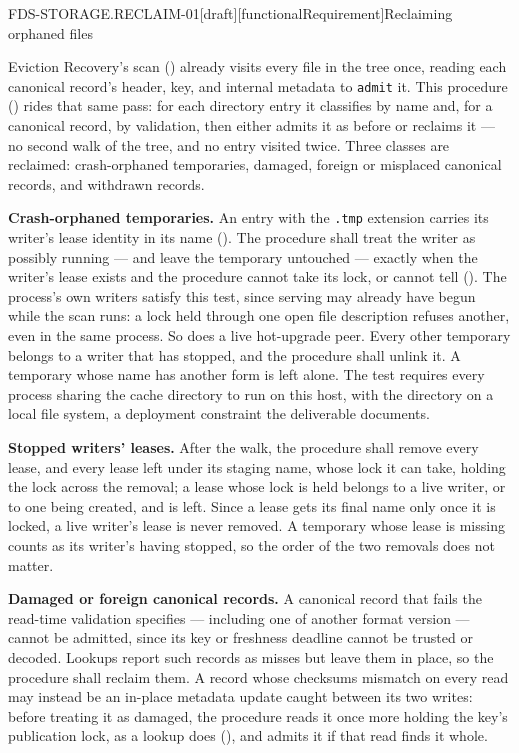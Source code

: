 \begin{requirement}{FDS-STORAGE.RECLAIM-01}[draft][functionalRequirement]{Reclaiming orphaned files}


  Eviction Recovery's scan () already visits
  every file in the tree once, reading each canonical record's header, key,
  and internal metadata to \texttt{admit} it. This procedure
  () rides that same pass: for each directory
  entry it classifies by name and, for a canonical record, by validation,
  then either admits it as before or reclaims it --- no second walk of the
  tree, and no entry visited twice. Three classes are reclaimed:
  crash-orphaned temporaries, damaged, foreign or misplaced canonical
  records, and withdrawn records.

  \textbf{Crash-orphaned temporaries.} An entry with the \texttt{.tmp}
  extension carries its writer's lease identity in its name
  (). The procedure shall treat the writer as
  possibly running --- and leave the temporary untouched --- exactly when
  the writer's lease exists and the procedure cannot take its lock, or
  cannot tell (). The process's own writers
  satisfy this test, since serving may already have begun while the scan
  runs: a lock held through one open file description refuses another, even
  in the same process. So does a live hot-upgrade peer. Every other
  temporary belongs to a writer that has stopped, and the procedure shall
  unlink it. A temporary whose name has another form is left alone. The test
  requires every process sharing the cache directory to run on this host,
  with the directory on a local file system, a deployment constraint the
  deliverable documents.

  \textbf{Stopped writers' leases.} After the walk, the procedure shall
  remove every lease, and every lease left under its staging name, whose
  lock it can take, holding the lock across the removal; a lease whose lock
  is held belongs to a live writer, or to one being created, and is left.
  Since a lease gets its final name only once it is locked, a live writer's
  lease is never removed. A temporary whose lease is missing counts as its
  writer's having stopped, so the order of the two removals does not
  matter.

  \textbf{Damaged or foreign canonical records.} A canonical record that fails
  the read-time validation  specifies ---
  including one of another format version --- cannot be admitted, since its key or freshness
  deadline cannot be trusted or decoded. Lookups report such records as
  misses but leave them in place, so the procedure shall reclaim them. A
  record whose checksums mismatch on every read may instead be an in-place
  metadata update caught between its two writes: before treating it as
  damaged, the procedure reads it once more holding the key's publication
  lock, as a lookup does (), and admits it
  if that read finds it whole.


\end{requirement}
